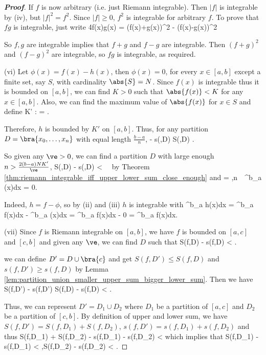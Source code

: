\begin{proof}[{\bf Proof}]
If $f$ is now arbitrary (i.e. just Riemann integrable). Then $|f|$ is integrable by (iv), but $|f|^2= f^2$. Since $|f|\geq 0$, $f^2$ is integrable for arbitrary $f$. To prove that $fg$ is integrable, just write
\be
4f(x)g(x) = (f(x)+g(x))^2 - (f(x)-g(x))^2
\ee

So $f,g$ are integrable implies that $f+g$ and $f-g$ are integrable. Then $(f+g)^2$ and $(f-g)^2$ are integrable, so $fg$ is integrable, as required.

\item [(vi)] Let $\phi(x)=f(x)-h(x)$, then $\phi(x)=0$, for every $x\in[a,b]$ except a finite set, say $S$, with cardinality $\abs{S}=N$. Since $f(x)$ is integrable thus it is bounded on $[a,b]$, we can find $K>0$ such that $\abs{f(x)} < K$ for any $x\in [a,b]$. Also, we can find the maximum value of $\abs{f(x)}$ for $x\in S$ and define
    \be
    K' : = \max{}.
    \ee

Therefore, $h$ is bounded by $K'$ on $[a,b]$. Thus, for any partition $D = \bra{x_0,\dots,x_n}$ with equal length $\frac {b-a}n$, %
\be
-  \leq s(\phi,D) \leq S(\phi,D) \leq {}.
\ee

So given any $\ve>0$, we can find a partition $D$ with large enough $n > \frac{2(b-a)NK'}{\ve}$,
\be
S(\phi,D) - s(\phi,D) <\ve\ \ra\ \phi{}
\ee
by Theorem \ref{thm:riemann_integrable_iff_upper_lower_sum_close_enough} and
\be
{} =  \leq {} ,\quad {}n\to\infty \ \ra\ \int^b_a \phi(x)dx = 0.
\ee


Indeed, $h=f-\phi$, so by (ii) and (iii) $h$ is integrable with
\be
\int^b_a h(x)dx = \int^b_a f(x)dx  - \int^b_a \phi(x)dx = \int^b_a f(x)dx - 0 = \int^b_a f(x)dx.
\ee

\item [(vii)] Since $f$ is Riemann integrable on $[a,b]$, we have $f$ is bounded on $[a,c]$ and $[c,b]$ and given any $\ve$, we can find $D$ such that
\be
S(f,D) - s(f,D) < \ve.
\ee

we can define $D' = D\cup \bra{c}$ and get $S(f,D') \leq S(f,D)$ and $s(f,D') \geq s(f,D)$ by Lemma \ref{lem:partition_union_smaller_upper_sum_bigger_lower_sum}. Then we have
\be
S(f,D') - s(f,D') \leq S(f,D) - s(f,D)  < \ve.
\ee

Thus, we can represent $D' = D_1\cup D_2$ where $D_1$ be a partition of $[a,c]$ and $D_2$ be a partition of $[c,b]$. By definition of upper and lower sum, we have $S(f,D') = S(f,D_1) + S(f,D_2)$, $s(f,D') = s(f,D_1) + s(f,D_2)$ and thus
\be
 S(f,D_1) + S(f,D_2) - s(f,D_1) - s(f,D_2) < \ve
\ee
which implies that
\be
S(f,D_1) - s(f,D_1) < \ve,\quad S(f,D_2) - s(f,D_2) < \ve.
\ee


\end{proof}
